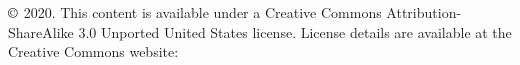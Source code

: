 \chapter*{}
\vfill


\noindent $\copyright$ 2020. This content is available under a Creative Commons Attribution-ShareAlike 3.0 Unported United States license. License details are available at the Creative Commons website:  \\


